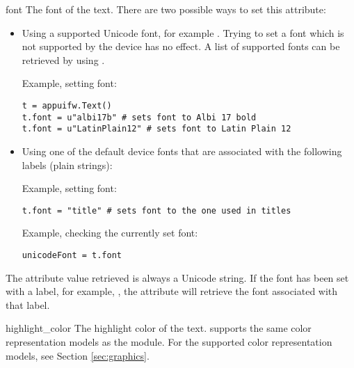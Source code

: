 \begin{memberdesc}[Text]{font} 
The font of the text. There are two possible ways to set this attribute:

\begin{itemize}

\item Using a supported Unicode font, for example . Trying to set a font which is not supported by the device has no effect. A list of supported fonts can be retrieved by using .

Example, setting font:
\begin{verbatim}
t = appuifw.Text()
t.font = u"albi17b" # sets font to Albi 17 bold
t.font = u"LatinPlain12" # sets font to Latin Plain 12
\end{verbatim}
\item Using one of the default device fonts that are associated with the following labels (plain strings):

Example, setting font: 
\begin{verbatim}
t.font = "title" # sets font to the one used in titles
\end{verbatim}

Example, checking the currently set font: 
\begin{verbatim}
unicodeFont = t.font
\end{verbatim}
\end{itemize}

The attribute value retrieved is always a Unicode string. If the font has 
been set with a label, for example, , the attribute will 
retrieve the font associated with that label. 
\end{memberdesc}

\begin{memberdesc}[Text]{highlight_color}
The highlight color of the text.  supports the 
same color representation models as the  module. For the 
supported color representation models, see Section \ref{sec:graphics}.
\end{memberdesc}

